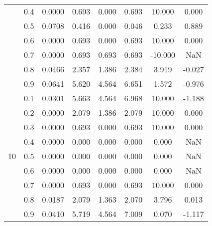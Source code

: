 \documentclass[11pt,a4paper]{report}
\begin{document}
\begin{longtable}{ | c | c || c | c | c | c | c | c | }
 & 0.4 & 0.0000 & 0.693 & 0.000 & 0.693 & 10.000 & 0.000 \\
 & 0.5 & 0.0708 & 0.416 & 0.000 & 0.046 & 0.233 & 0.889 \\
 & 0.6 & 0.0000 & 0.693 & 0.000 & 0.693 & 10.000 & 0.000 \\
 & 0.7 & 0.0000 & 0.693 & 0.693 & 0.693 & -10.000 & NaN \\
 & 0.8 & 0.0466 & 2.357 & 1.386 & 2.384 & 3.919 & -0.027 \\
 & 0.9 & 0.0641 & 5.620 & 4.564 & 6.651 & 1.572 & -0.976 \\
 \hline
\multirow{9}{*}{10} & 0.1 & 0.0301 & 5.663 & 4.564 & 6.968 & 10.000 & -1.188 \\
 & 0.2 & 0.0000 & 2.079 & 1.386 & 2.079 & 10.000 & 0.000 \\
 & 0.3 & 0.0000 & 0.693 & 0.000 & 0.693 & 10.000 & 0.000 \\
 & 0.4 & 0.0000 & 0.000 & 0.000 & 0.000 & 0.000 & NaN \\
 & 0.5 & 0.0000 & 0.000 & 0.000 & 0.000 & 0.000 & NaN \\
 & 0.6 & 0.0000 & 0.000 & 0.000 & 0.000 & 0.000 & NaN \\
 & 0.7 & 0.0000 & 0.693 & 0.000 & 0.693 & 10.000 & 0.000 \\
 & 0.8 & 0.0187 & 2.079 & 1.363 & 2.070 & 3.796 & 0.013 \\
 & 0.9 & 0.0410 & 5.719 & 4.564 & 7.009 & 0.070 & -1.117 \\
 \hline
\hline
\end{longtable}
\end{document}
